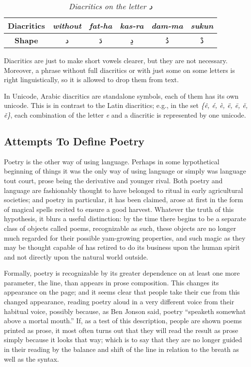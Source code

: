 \documentclass[12pt]{report}
\begin{document}
\begin{table}[!t]
  \centering
  \begin{tabular}{c c c c c c} 
    \toprule
    \textbf{\small{Diacritics}}     & \small{\textit{without}} & \small{\textit{fat-ha}} &
            \small{\textit{kas-ra}} & \small{\textit{dam-ma}} & \small{\textit{sukun}}\\
    \midrule
    \textbf{\small{Shape}}   & \textarabic{د} & \textarabic{دَ} & \textarabic{دِ} &
            \textarabic{دُ} & \textarabic{دْ}\\
    \bottomrule
  \end{tabular}
  \caption{\textit{Diacritics on the letter \textarabic{د}}}\label{arabic:diacritics_dal}
\end{table}

Diacritics are just to make short vowels clearer, but they are not necessary.
Moreover, a phrase without full diacritics or with just some on some letters is
right linguistically, so it is allowed to drop them from text.

In Unicode, Arabic diacritics are standalone symbols, each of them has its own
unicode. This is in contrast to the Latin diacritics; e.g., in the set
\textit{\{ê, é, è, ë, ē, ĕ, ě\}}, each combination of the letter \textit{e} and a diacritic is represented by one unicode.


\subsection*{Attempts To Define Poetry}
Poetry is the other way of using language. Perhaps in some hypothetical beginning
of things it was the only way of using language or simply was language tout
court, prose being the derivative and younger rival. Both poetry and language are
fashionably thought to have belonged to ritual in early agricultural societies;
and poetry in particular, it has been claimed, arose at first in the form of
magical spells recited to ensure a good harvest. Whatever the truth of this
hypothesis, it blurs a useful distinction: by the time there begins to be a
separate class of objects called poems, recognizable as such, these objects are
no longer much regarded for their possible yam-growing properties, and such magic
as they may be thought capable of has retired to do its business upon the human
spirit and not directly upon the natural world outside.

Formally, poetry is recognizable by its greater dependence on at least one more
parameter, the line, than appears in prose composition. This changes its
appearance on the page; and it seems clear that people take their cue from this
changed appearance, reading poetry aloud in a very different voice from their
habitual voice, possibly because, as Ben Jonson said, poetry “speaketh somewhat
above a mortal mouth.” If, as a test of this description, people are shown poems
printed as prose, it most often turns out that they will read the result as prose
simply because it looks that way; which is to say that they are no longer guided
in their reading by the balance and shift of the line in relation to the breath
as well as the syntax.
\end{document}
